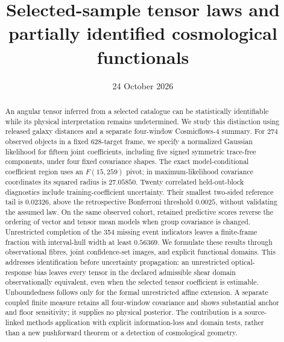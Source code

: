 \documentclass[aps,prd,onecolumn,nofootinbib,superscriptaddress,longbibliography,floatfix]{revtex4-2}
\begin{document}
\title{Selected-sample tensor laws and partially identified cosmological functionals}
\date{24 October 2026}
\begin{abstract}
An angular tensor inferred from a selected catalogue can be statistically identifiable while its physical interpretation remains undetermined. We study this distinction using released galaxy distances and a separate four-window Cosmicflows-4 summary. For 274 observed objects in a fixed 628-target frame, we specify a normalized Gaussian likelihood for fifteen joint coefficients, including five signed symmetric trace-free components, under four fixed covariance shapes. The exact model-conditional coefficient region uses an $F(15,259)$ pivot; in maximum-likelihood covariance coordinates its squared radius is $27.05850$. Twenty correlated held-out-block diagnostics include training-coefficient uncertainty. Their smallest two-sided reference tail is $0.02326$, above the retrospective Bonferroni threshold $0.0025$, without validating the assumed law. On the same observed cohort, retained predictive scores reverse the ordering of vector and tensor mean models when group covariance is changed. Unrestricted completion of the 354 missing event indicators leaves a finite-frame fraction with interval-hull width at least $0.56369$. We formulate these results through observational fibres, joint confidence-set images, and explicit functional domains. This addresses identification before uncertainty propagation: an unrestricted optical-response bias leaves every tensor in the declared admissible shear domain observationally equivalent, even when the selected tensor coefficient is estimable. Unboundedness follows only for the formal unrestricted affine extension. A separate coupled finite measure retains all four-window covariance and shows substantial anchor and floor sensitivity; it supplies no physical posterior. The contribution is a source-linked methods application with explicit information-loss and domain tests, rather than a new pushforward theorem or a detection of cosmological geometry.
\end{abstract}
\maketitle






\appendix



\end{document}
